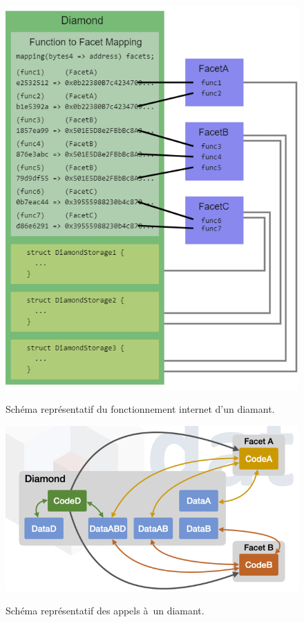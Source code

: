 \begin{figure}[h]
  \caption{Schéma représentatif du fonctionnement internet d'un diamant.}
  \includegraphics[scale=0.5]{diamond_struct.png}
  \centering 
  \label{fig:diamond_struct}
\end{figure}

\begin{figure}[h]
  \caption{Schéma représentatif des appels à un diamant.}
  \includegraphics[scale=0.5]{diamond_ex.png}
  \centering
  \label{fig:diamond_ex}
\end{figure}


